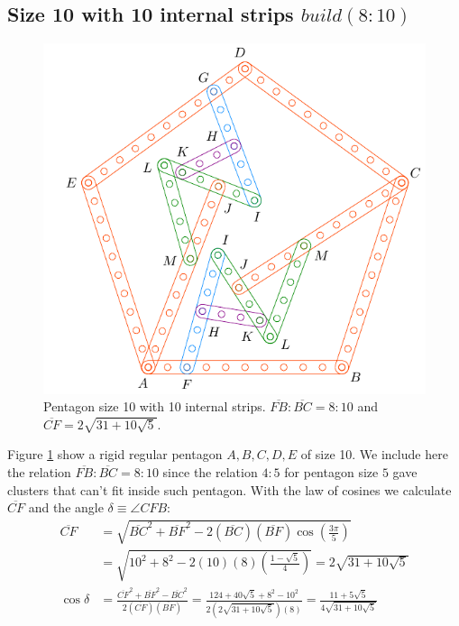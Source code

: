 \documentclass[11pt]{article}
\begin{document}
\subsection{Size 10 with 10 internal strips $build(8:10)$}

\begin{figure}[h]
 \centering
 \includegraphics[scale=0.9]{10/penta10b}
 \caption{Pentagon size 10 with 10 internal strips. $\overline{FB}:\overline{BC} = 8:10$ and $\overline{CF} = 2\sqrt{31 + 10\sqrt5}$.}
 \label{fig:penta10b}
\end{figure}

Figure \ref{fig:penta10b} show a rigid regular pentagon $A,B,C,D,E$ of size 10. We include here the relation $\overline{FB}:\overline{BC} = 8:10$ since the relation $4:5$ for pentagon size $5$ gave clusters that can't fit inside such pentagon. With the law of cosines we calculate $\overline{CF}$ and
the angle $\delta \equiv \angle{CFB}$:
\begin{align}
\overline{CF} &= \sqrt{\overline{BC}^2 + \overline{BF}^2
 - 2(\overline{BC})(\overline{BF})\cos\left(\frac{3\pi}5\right)} \nonumber\\
 &= \sqrt{10^2 + 8^2 - 2(10)(8)\left(\frac{1-\sqrt5}4\right)} = 2\sqrt{31 + 10\sqrt5} \\
%
\cos\delta &= \frac{\overline{CF}^2 + \overline{BF}^2 - \overline{BC}^2}
 {2(\overline{CF})(\overline{BF})}%
 = \frac{124+40\sqrt5 + 8^2 - 10^2}{2(2\sqrt{31 + 10\sqrt5})(8)}
  = \frac{11 + 5\sqrt5}{4\sqrt{31+10\sqrt5}}
\end{align}
\end{document}
